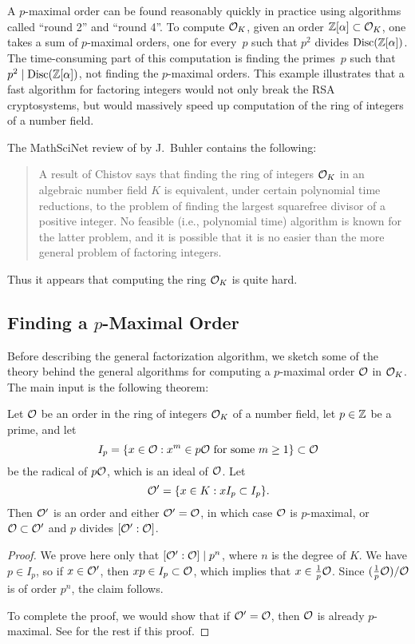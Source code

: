 A $p$-maximal order can be found reasonably quickly in practice using
algorithms called ``round 2'' and ``round 4''.  To
compute $\mathcal{O}_K$, given an order $\mathbb{Z}[\alpha]\subset \mathcal{O}_K$, one takes a
sum of $p$-maximal orders, one for every~$p$ such that $p^2$ divides
$\operatorname{Disc}(\mathbb{Z}[\alpha])$.  The time-consuming part of this computation is
finding the primes~$p$ such that $p^2\mid \operatorname{Disc}(\mathbb{Z}[\alpha])$, not
finding the $p$-maximal orders.  This example illustrates that
a fast algorithm for factoring integers would not only break the RSA
cryptosystems, but would massively speed up computation of the ring of
integers of a number field.
\begin{remark}
	The MathSciNet review of \cite{buchmann_lenstra:approx} by
	J.~Buhler contains the following:
	\begin{quote}
	    A result of Chistov says that finding the ring of integers $\mathcal{O}_K$
	    in an algebraic number field $K$ is equivalent, under certain
	    polynomial time reductions, to the problem of finding the largest
	    squarefree divisor of a positive integer. No feasible (i.e.,
	    polynomial time) algorithm is known for the latter problem, and it
	    is possible that it is no easier than the more general problem of
	    factoring integers.
	\end{quote}
	Thus it appears that computing the ring $\mathcal{O}_K$ is quite hard.
\end{remark}

\subsection{Finding a $p$-Maximal Order}\label{sec:alg_pmax}

Before describing the general factorization algorithm, we sketch some
of the theory behind the general algorithms for computing a
$p$-maximal order $\mathcal{O}$ in $\mathcal{O}_K$.  The main input is the following theorem:
\begin{theorem}
	Let $\mathcal{O}$ be an order in the ring of integers $\mathcal{O}_K$ of a number field,
	let $p\in\mathbb{Z}$ be a prime, and let
	$$
		I_p = \{x \in \mathcal{O} : x^m \in p\mathcal{O} \text{ for some $m\geq 1$}\} \subset \mathcal{O}
	$$
	be the radical of $p\mathcal{O}$, which is an ideal of $\mathcal{O}$. Let
	$$
		\mathcal{O}' = \{x \in K : xI_p \subset I_p\}.
	$$
	Then $\mathcal{O}'$ is an order and either $\mathcal{O}'=\mathcal{O}$, in which case $\mathcal{O}$ is
	$p$-maximal, or $\mathcal{O}\subset\mathcal{O}'$ and $p$ divides $[\mathcal{O}':\mathcal{O}]$.
\end{theorem}
\begin{proof}
	We prove here only that $[\mathcal{O}':\mathcal{O}] \mid p^n$, where $n$ is the degree
	of $K$.  We have $p\in I_p$, so if $x \in \mathcal{O}'$, then $xp \in
	I_p\subset \mathcal{O}$, which implies that $x\in \frac{1}{p}\mathcal{O}$.  Since
	$(\frac{1}{p}\mathcal{O})/\mathcal{O}$ is of order $p^n$, the claim follows.

	To complete the proof, we would show that if $\mathcal{O}' = \mathcal{O}$, then $\mathcal{O}$ is
	already $p$-maximal.  See \cite[\S6.1.1]{cohen:course_ant} for the
	rest if this proof.
\end{proof}

